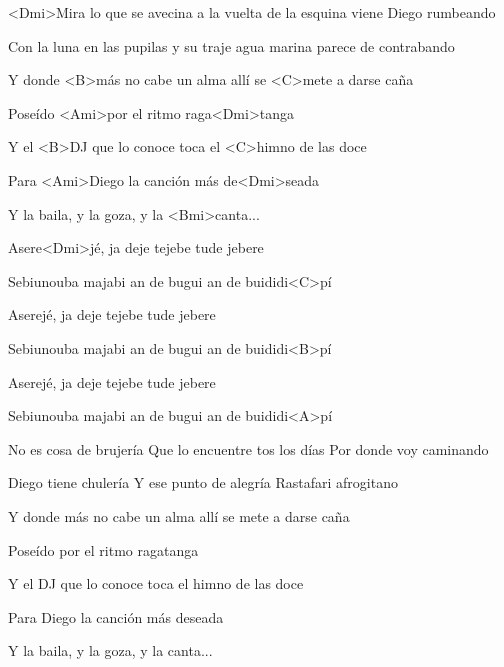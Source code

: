 

\zs
<Dmi>Mira lo que se avecina a la vuelta de la esquina viene Diego rumbeando

Con la luna en las pupilas y su traje agua marina parece de contrabando


Y donde <B>más no cabe un alma allí se <C>mete a darse caña

Poseído <Ami>por el ritmo raga<Dmi>tanga

Y el <B>DJ que lo conoce toca el <C>himno de las doce

Para <Ami>Diego la canción más de<Dmi>seada

Y la baila, y la goza, y la <Bmi>canta...
\ks

\zr
Asere<Dmi>jé, ja deje tejebe tude jebere

Sebiunouba majabi an de bugui an de buididi<C>pí

Aserejé, ja deje tejebe tude jebere

Sebiunouba majabi an de bugui an de buididi<B>pí

Aserejé, ja deje tejebe tude jebere

Sebiunouba majabi an de bugui an de buididi<A>pí
\kr

\zs
No es cosa de brujería
Que lo encuentre tos los días
Por donde voy caminando

Diego tiene chulería
Y ese punto de alegría
Rastafari afrogitano

Y donde más no cabe un alma allí se mete a darse caña

Poseído por el ritmo ragatanga

Y el DJ que lo conoce toca el himno de las doce

Para Diego la canción más deseada

Y la baila, y la goza, y la canta...
\ks

\zr
\kr

\kp
